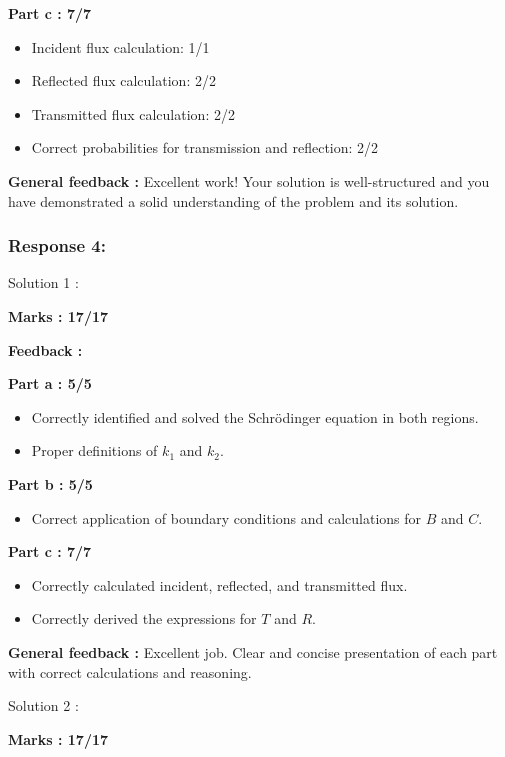 \documentclass[a4paper,11pt]{article}
\begin{document}
\textbf{Part c : 7/7}

\begin{itemize}
    \item Incident flux calculation: 1/1
    \item Reflected flux calculation: 2/2
    \item Transmitted flux calculation: 2/2
    \item Correct probabilities for transmission and reflection: 2/2
\end{itemize}

\textbf{General feedback :}
Excellent work! Your solution is well-structured and you have demonstrated a solid understanding of the problem and its solution.

\subsubsection*{Response 4:}

Solution 1 :

\textbf{Marks : 17/17}

\textbf{Feedback :}

\textbf{Part a : 5/5}

\begin{itemize}
    \item Correctly identified and solved the Schrödinger equation in both regions.
    \item Proper definitions of $k_1$ and $k_2$.
\end{itemize}

\textbf{Part b : 5/5}

\begin{itemize}
    \item Correct application of boundary conditions and calculations for $B$ and $C$.
\end{itemize}

\textbf{Part c : 7/7}

\begin{itemize}
    \item Correctly calculated incident, reflected, and transmitted flux.
    \item Correctly derived the expressions for $T$ and $R$.
\end{itemize}

\textbf{General feedback :}
Excellent job. Clear and concise presentation of each part with correct calculations and reasoning.


Solution 2 :

\textbf{Marks : 17/17}
\end{document}
